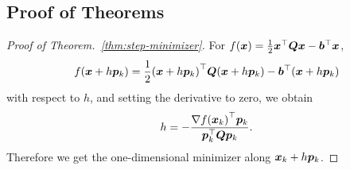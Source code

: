 \subsection{Proof of Theorems}\label{app:proof}
\begin{proof}[Proof of Theorem.~\ref{thm:step-minimizer}]
    For \(f(\bm{x}) = \frac{1}{2} \bm{x}^\top \bm{Q} \bm{x} - \bm{b}^\top \bm{x}\),
    \[
        f(\bm{x} + h\bm{p}_k) = \frac{1}{2} {(\bm{x} + h\bm{p}_k)}^\top \bm{Q} (\bm{x} + h\bm{p}_k) - 
        \bm{b}^\top (\bm{x} + h\bm{p}_k)
    \]
    with respect to \(h\), and setting the derivative to zero, we obtain
    \[
        h = -\frac{\nabla f {(\bm{x}_k)}^\top \bm{p}_k}{\bm{p}_k^\top \bm{Q} \bm{p}_k}.
    \]
    Therefore we get the one-dimensional minimizer along \(\bm{x}_k + h \bm{p}_k\). 
\end{proof}